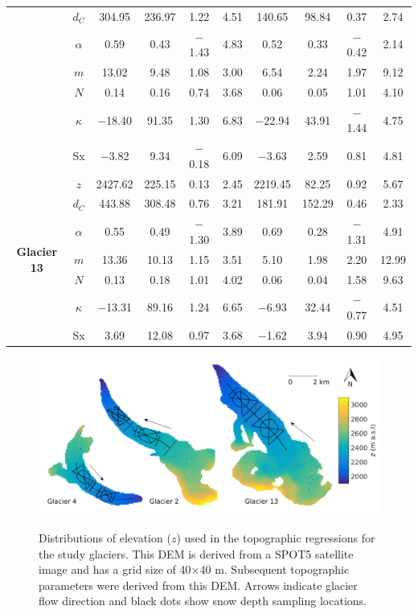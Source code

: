 \documentclass{sfuthesis}
\newcommand{\topomap}{Arrows indicate glacier flow direction and black dots show snow depth sampling locations. }
\begin{document}
\begin{table}
\begin{tabular}{cc|cccc|cccc}
 & $d_C$ & 304.95 & 236.97 & 1.22 & 4.51 & 140.65 & 98.84 & 0.37 & 2.74 \\
 & $\alpha$ & 0.59 & 0.43 & $-$1.43 & 4.83 & 0.52 & 0.33 & $-$0.42 & 2.14 \\
 & $m$ & 13.02 & 9.48 & 1.08 & 3.00 & 6.54 & 2.24 & 1.97 & 9.12 \\
 & $N$ & 0.14 & 0.16 & 0.74 & 3.68 & 0.06 & 0.05 & 1.01 & 4.10 \\
 & $\kappa$ & $-$18.40 & 91.35 & 1.30 & 6.83 & $-$22.94 & 43.91 & $-$1.44 & 4.75 \\
 & Sx & $-$3.82 & 9.34 & $-$0.18 & 6.09 & $-$3.63 & 2.59 & 0.81 & 4.81 \\ \hline
\multirow{7}{*}{\textbf{Glacier 13}} & $z$ & 2427.62 & 225.15 & 0.13 & 2.45 & 2219.45 & 82.25 & 0.92 & 5.67 \\
 & $d_C$ & 443.88 & 308.48 & 0.76 & 3.21 & 181.91 & 152.29 & 0.46 & 2.33 \\
 & $\alpha$ & 0.55 & 0.49 & $-$1.30 & 3.89 & 0.69 & 0.28 & $-$1.31 & 4.91 \\
 & $m$ & 13.36 & 10.13 & 1.15 & 3.51 & 5.10 & 1.98 & 2.20 & 12.99 \\
 & $N$ & 0.13 & 0.18 & 1.01 & 4.02 & 0.06 & 0.04 & 1.58 & 9.63 \\
 & $\kappa$ & $-$13.31 & 89.16 & 1.24 & 6.65 & $-$6.93 & 32.44 & $-$0.77 & 4.51 \\
 & Sx & 3.69 & 12.08 & 0.97 & 3.68 & $-$1.62 & 3.94 & 0.90 & 4.95
\end{tabular}
\end{table}

\pagebreak
\begin{figure}[H]
	\centering
	\includegraphics[width = \textwidth]{Map_elevation.png}\\
	\caption{Distributions of elevation ($z$) used in the topographic regressions for the study glaciers. This DEM is derived from a SPOT5 satellite image and has a grid size of 40$\times$40 m. Subsequent topographic parameters were derived from this DEM. \topomap}
	\label{map:elev}
\end{figure}
\end{document}
